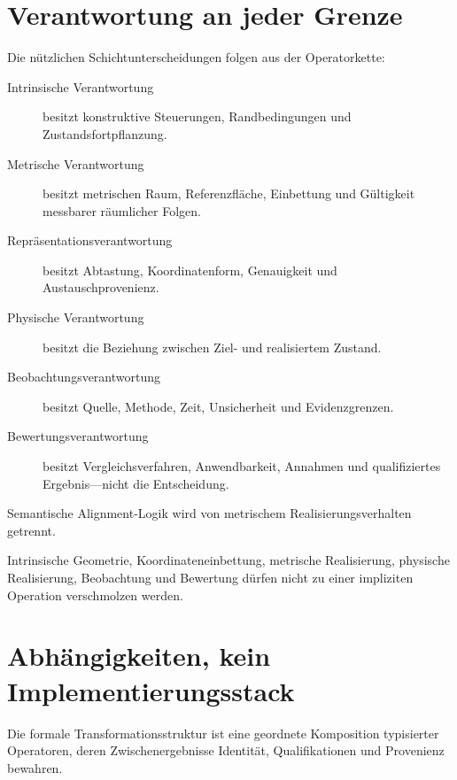 \section{Verantwortung an jeder Grenze}

Die nützlichen Schichtunterscheidungen folgen aus der Operatorkette:

\begin{description}
\item[Intrinsische Verantwortung] besitzt konstruktive Steuerungen,
  Randbedingungen und Zustandsfortpflanzung.
\item[Metrische Verantwortung] besitzt metrischen Raum, Referenzfläche,
  Einbettung und Gültigkeit messbarer räumlicher Folgen.
\item[Repräsentationsverantwortung] besitzt Abtastung, Koordinatenform,
  Genauigkeit und Austauschprovenienz.
\item[Physische Verantwortung] besitzt die Beziehung zwischen Ziel- und
  realisiertem Zustand.
\item[Beobachtungsverantwortung] besitzt Quelle, Methode, Zeit, Unsicherheit
  und Evidenzgrenzen.
\item[Bewertungsverantwortung] besitzt Vergleichsverfahren, Anwendbarkeit,
  Annahmen und qualifiziertes Ergebnis---nicht die Entscheidung.
\end{description}

\begin{principle}
\label{princ:metric-realization-layer}
Semantische Alignment-Logik wird von metrischem Realisierungsverhalten
getrennt.
\end{principle}

\begin{principle}
\label{princ:canonical-layer-separation}
Intrinsische Geometrie, Koordinateneinbettung, metrische Realisierung,
physische Realisierung, Beobachtung und Bewertung dürfen nicht zu einer
impliziten Operation verschmolzen werden.
\end{principle}

\section{Abhängigkeiten, kein Implementierungsstack}

\begin{definition}
\label{def:canonical-transformation-structure}
Die formale Transformationsstruktur ist eine geordnete Komposition typisierter
Operatoren, deren Zwischenergebnisse Identität, Qualifikationen und Provenienz
bewahren.
\end{definition}

